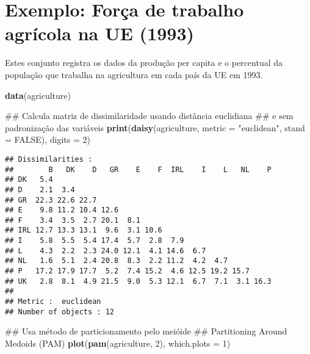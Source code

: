 \documentclass[]{book}
\newenvironment{Shaded}{\begin{snugshade}}{\end{snugshade}}
\newcommand{\KeywordTok}[1]{\textcolor[rgb]{0.13,0.29,0.53}{\textbf{{#1}}}}
\newcommand{\DataTypeTok}[1]{\textcolor[rgb]{0.13,0.29,0.53}{{#1}}}
\newcommand{\DecValTok}[1]{\textcolor[rgb]{0.00,0.00,0.81}{{#1}}}
\newcommand{\StringTok}[1]{\textcolor[rgb]{0.31,0.60,0.02}{{#1}}}
\newcommand{\OtherTok}[1]{\textcolor[rgb]{0.56,0.35,0.01}{{#1}}}
\newcommand{\NormalTok}[1]{{#1}}
\begin{document}
\section{Exemplo: Força de trabalho agrícola na UE
(1993)}\label{exemplo-forca-de-trabalho-agricola-na-ue-1993}

Estes conjunto registra os dados da produção per capita e o percentual
da população que trabalha na agricultura em cada país da UE em 1993.

\begin{Shaded}
\begin{Highlighting}[]
\KeywordTok{data}\NormalTok{(agriculture)}

\NormalTok{## Calcula matriz de dissimilaridade usando distância euclidiana }
\NormalTok{## e sem padronização das variáveis}
\KeywordTok{print}\NormalTok{(}\KeywordTok{daisy}\NormalTok{(agriculture, }\DataTypeTok{metric =} \StringTok{"euclidean"}\NormalTok{, }\DataTypeTok{stand =} \OtherTok{FALSE}\NormalTok{),}
      \DataTypeTok{digits =} \DecValTok{2}\NormalTok{)}
\end{Highlighting}
\end{Shaded}

\begin{verbatim}
## Dissimilarities :
##        B   DK    D   GR    E    F  IRL    I    L   NL    P
## DK   5.4                                                  
## D    2.1  3.4                                             
## GR  22.3 22.6 22.7                                        
## E    9.8 11.2 10.4 12.6                                   
## F    3.4  3.5  2.7 20.1  8.1                              
## IRL 12.7 13.3 13.1  9.6  3.1 10.6                         
## I    5.8  5.5  5.4 17.4  5.7  2.8  7.9                    
## L    4.3  2.2  2.3 24.0 12.1  4.1 14.6  6.7               
## NL   1.6  5.1  2.4 20.8  8.3  2.2 11.2  4.2  4.7          
## P   17.2 17.9 17.7  5.2  7.4 15.2  4.6 12.5 19.2 15.7     
## UK   2.8  8.1  4.9 21.5  9.0  5.3 12.1  6.7  7.1  3.1 16.3
## 
## Metric :  euclidean 
## Number of objects : 12
\end{verbatim}

\begin{Shaded}
\begin{Highlighting}[]
\NormalTok{## Usa método de particionamento pelo meióide }
\NormalTok{## Partitioning Around Medoids (PAM)}
\KeywordTok{plot}\NormalTok{(}\KeywordTok{pam}\NormalTok{(agriculture, }\DecValTok{2}\NormalTok{), }\DataTypeTok{which.plots =} \DecValTok{1}\NormalTok{)}
\end{Highlighting}
\end{Shaded}
\end{document}
